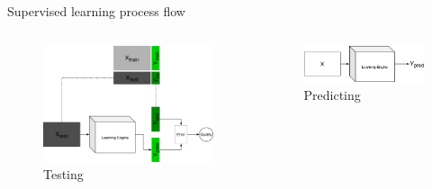 \begin{frame}{Supervised learning process flow}
	\begin{columns}
		\begin{column}{.5\textwidth}
			\begin{figure}
				\includegraphics[width=1.\textwidth, center]{figures/ml_1_test}
				\caption*{Testing}
			\end{figure}
		\end{column}
		\begin{column}{.5\textwidth}
			\begin{figure}
				\includegraphics[width=1.\textwidth, center]{figures/ml_1_infer}
				\caption*{Predicting}
			\end{figure}
		\end{column}
	\end{columns}
\end{frame}



